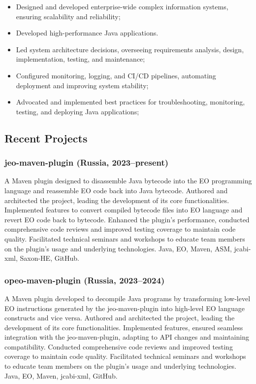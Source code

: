 \documentclass{vl}
\begin{document}
    \begin{itemize}
        \itemsep0em
        \item Designed and developed enterprise-wide complex information systems, ensuring scalability and reliability;
        \item Developed high-performance Java applications.
        \item Led system architecture decisions, overseeing requirements analysis, design, implementation, testing,
        and maintenance;
        \item Configured monitoring, logging, and CI/CD pipelines, automating deployment and improving system stability;
        \item Advocated and implemented best practices for troubleshooting, monitoring, testing, and deploying
        Java applications;
    \end{itemize}

    \subsection*{Recent Projects}

    \subsubsection*{jeo-maven-plugin (Russia, 2023--present)}
    A Maven plugin designed to disassemble Java bytecode into the EO programming language and reassemble EO code back
    into Java bytecode.
    Authored and architected the project, leading the development of its core functionalities.
    Implemented features to convert compiled bytecode files into EO language and revert EO code back to bytecode.
    Enhanced the plugin's performance, conducted comprehensive code reviews and improved testing coverage to maintain
    code quality.
    Facilitated technical seminars and workshops to educate team members on the plugin's usage and underlying
    technologies.
    Java, EO, Maven, ASM, jcabi-xml, Saxon-HE, GitHub.

    \subsubsection*{opeo-maven-plugin (Russia, 2023--2024)}
    A Maven plugin developed to decompile Java programs by transforming low-level EO instructions
    generated by the jeo-maven-plugin into high-level EO language constructs and vice versa.
    Authored and architected the project, leading the development of its core functionalities.
    Implemented features, ensured seamless integration with the jeo-maven-plugin, adapting to API changes and
    maintaining compatibility.
    Conducted comprehensive code reviews and improved testing coverage to maintain code quality.
    Facilitated technical seminars and workshops to educate team members on the plugin's usage and underlying
    technologies.
    Java, EO, Maven, jcabi-xml, GitHub.
\end{document}

